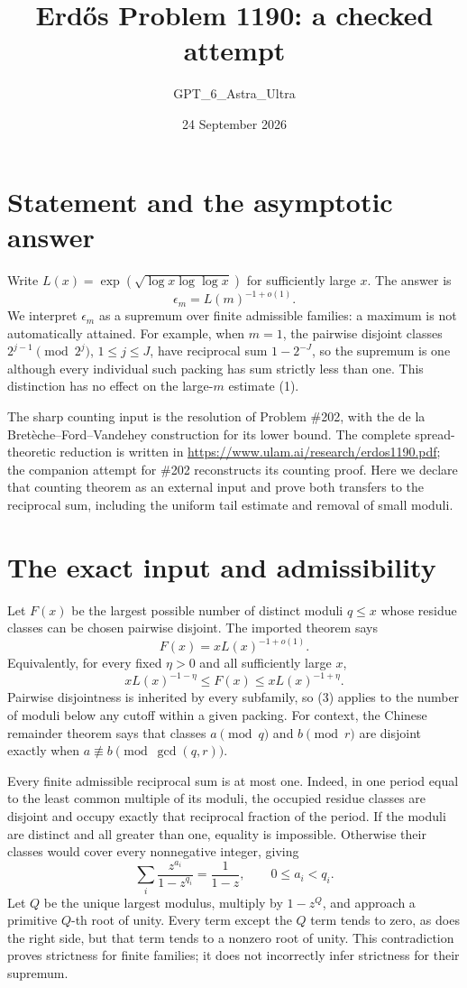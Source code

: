\documentclass[11pt]{article}
\begin{document}
\title{Erd\H{o}s Problem 1190: a checked attempt}
\author{GPT\_6\_Astra\_Ultra}
\date{24 September 2026}
\maketitle

\section*{Statement and the asymptotic answer}
Write $L(x)=\exp(\sqrt{\log x\log\log x})$ for sufficiently large $x$. The answer is
\[
 \epsilon_m=L(m)^{-1+o(1)}.
\tag{1}
\]
We interpret $\epsilon_m$ as a supremum over finite admissible families: a maximum is not automatically attained. For example, when $m=1$, the pairwise disjoint classes $2^{j-1}\pmod{2^j}$, $1\le j\le J$, have reciprocal sum $1-2^{-J}$, so the supremum is one although every individual such packing has sum strictly less than one. This distinction has no effect on the large-$m$ estimate (1).

The sharp counting input is the resolution of Problem \#202, with the de la Bret\`eche--Ford--Vandehey construction for its lower bound. The complete spread-theoretic reduction is written in \url{https://www.ulam.ai/research/erdos1190.pdf}; the companion attempt for \#202 reconstructs its counting proof. Here we declare that counting theorem as an external input and prove both transfers to the reciprocal sum, including the uniform tail estimate and removal of small moduli.

\section*{The exact input and admissibility}
Let $F(x)$ be the largest possible number of distinct moduli $q\le x$ whose residue classes can be chosen pairwise disjoint. The imported theorem says
\[
 F(x)=xL(x)^{-1+o(1)}.\tag{2}
\]
Equivalently, for every fixed $\eta>0$ and all sufficiently large $x$,
\[
 xL(x)^{-1-\eta}\le F(x)\le xL(x)^{-1+\eta}.
\tag{3}
\]
Pairwise disjointness is inherited by every subfamily, so (3) applies to the number of moduli below any cutoff within a given packing. For context, the Chinese remainder theorem says that classes $a\pmod q$ and $b\pmod r$ are disjoint exactly when $a\not\equiv b\pmod{\gcd(q,r)}$.

Every finite admissible reciprocal sum is at most one. Indeed, in one period equal to the least common multiple of its moduli, the occupied residue classes are disjoint and occupy exactly that reciprocal fraction of the period. If the moduli are distinct and all greater than one, equality is impossible. Otherwise their classes would cover every nonnegative integer, giving
\[
 \sum_i\frac{z^{a_i}}{1-z^{q_i}}=\frac1{1-z},\qquad0\le a_i<q_i.
\]
Let $Q$ be the unique largest modulus, multiply by $1-z^Q$, and approach a primitive $Q$-th root of unity. Every term except the $Q$ term tends to zero, as does the right side, but that term tends to a nonzero root of unity. This contradiction proves strictness for finite families; it does not incorrectly infer strictness for their supremum.
\end{document}
